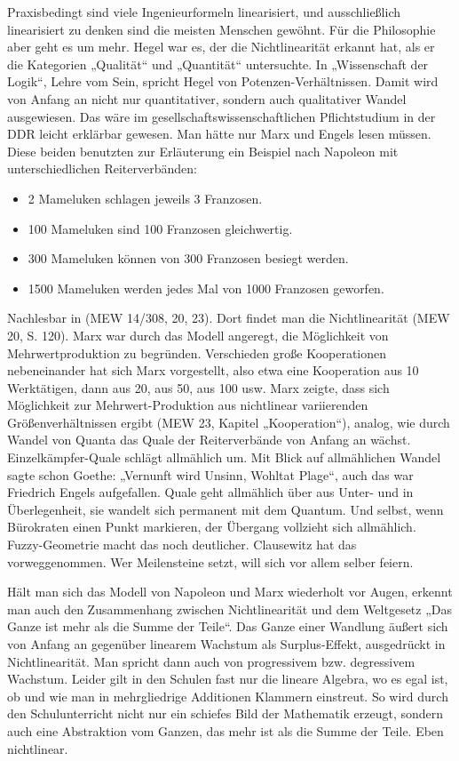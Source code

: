 \documentclass[11pt,a4paper]{article}
\begin{document}
Praxisbedingt sind viele Ingenieurformeln linearisiert, und ausschließlich
linearisiert zu denken sind die meisten Menschen gewöhnt. Für die Philosophie
aber geht es um mehr. Hegel war es, der die Nichtlinearität erkannt hat, als
er die Kategorien „Qualität“ und „Quantität“ untersuchte. In „Wissenschaft der
Logik“, Lehre vom Sein, spricht Hegel von Potenzen-Verhältnissen. Damit wird
von Anfang an nicht nur quantitativer, sondern auch qualitativer Wandel
ausgewiesen. Das wäre im gesellschaftswissenschaftlichen Pflichtstudium in der
DDR leicht erklärbar gewesen. Man hätte nur Marx und Engels lesen müssen.
Diese beiden benutzten zur Erläuterung ein Beispiel nach Napoleon mit
unterschiedlichen Reiterverbänden:
\begin{itemize}\itemsep0pt
\item 2 Mameluken schlagen jeweils 3 Franzosen.
\item 100 Mameluken sind 100 Franzosen gleichwertig.
\item 300 Mameluken können von 300 Franzosen besiegt werden.
\item 1500 Mameluken werden jedes Mal von 1000 Franzosen geworfen.
\end{itemize}
Nachlesbar in (MEW 14/308, 20, 23). Dort findet man die Nichtlinearität (MEW
20, S. 120). Marx war durch das Modell angeregt, die Möglichkeit von
Mehrwertproduktion zu begründen. Verschieden große Kooperationen nebeneinander
hat sich Marx vorgestellt, also etwa eine Kooperation aus 10 Werktätigen, dann
aus 20, aus 50, aus 100 usw. Marx zeigte, dass sich Möglichkeit zur
Mehrwert-Produktion aus nichtlinear variierenden Größenverhältnissen ergibt
(MEW 23, Kapitel „Kooperation“), analog, wie durch Wandel von Quanta das Quale
der Reiterverbände von Anfang an wächst. Einzelkämpfer-Quale schlägt
allmählich um. Mit Blick auf allmählichen Wandel sagte schon Goethe: „Vernunft
wird Unsinn, Wohltat Plage“, auch das war Friedrich Engels aufgefallen. Quale
geht allmählich über aus Unter- und in Überlegenheit, sie wandelt sich
permanent mit dem Quantum. Und selbst, wenn Bürokraten einen Punkt markieren,
der Übergang vollzieht sich allmählich. Fuzzy-Geometrie macht das noch
deutlicher. Clausewitz hat das vorweggenommen. Wer Meilensteine setzt, will
sich vor allem selber feiern.

Hält man sich das Modell von Napoleon und Marx wiederholt vor Augen, erkennt
man auch den Zusammenhang zwischen Nichtlinearität und dem Weltgesetz „Das
Ganze ist mehr als die Summe der Teile“. Das Ganze einer Wandlung äußert sich
von Anfang an gegenüber linearem Wachstum als Surplus-Effekt, ausgedrückt in
Nichtlinearität. Man spricht dann auch von progressivem bzw. degressivem
Wachstum. Leider gilt in den Schulen fast nur die lineare Algebra, wo es egal
ist, ob und wie man in mehrgliedrige Additionen Klammern einstreut. So wird
durch den Schulunterricht nicht nur ein schiefes Bild der Mathematik erzeugt,
sondern auch eine Abstraktion vom Ganzen, das mehr ist als die Summe der
Teile. Eben nichtlinear.
\end{document}
